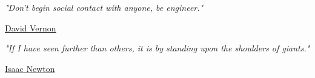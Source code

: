 \documentclass[11pt, oneside]{Thesis} %
\begin{document}
\pagestyle{empty} %

\null\vfill %

\textit{"Don't begin social contact with anyone, be engineer."}
\begin{flushright}
\href{http://www.vernon.eu/}{David Vernon}
\end{flushright}

\textit{"If I have seen further than others, it is by standing upon the shoulders of giants."}
\begin{flushright}
\href{https://en.wikipedia.org/wiki/Isaac_Newton}{Isaac Newton}
\end{flushright}

\vfill\vfill\vfill\vfill\vfill\vfill\null %

\clearpage %



\end{document}
